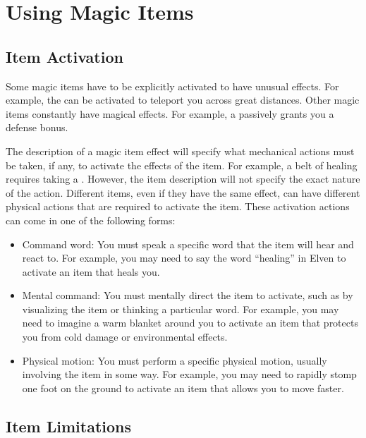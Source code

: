 \section{Using Magic Items}

    \subsection{Item Activation}

        Some magic items have to be explicitly activated to have unusual effects.
        For example, the  can be activated to teleport you across great distances.
        Other magic items constantly have magical effects.
        For example, a  passively grants you a defense bonus.

        The description of a magic item effect will specify what mechanical actions must be taken, if any, to activate the effects of the item.
        For example, a belt of healing requires taking a .
        However, the item description will not specify the exact nature of the action.
        Different items, even if they have the same effect, can have different physical actions that are required to activate the item.
        These activation actions can come in one of the following forms:
        \begin{itemize}
           \item Command word: You must speak a specific word that the item will hear and react to.
                For example, you may need to say the word ``healing'' in Elven to activate an item that heals you.
            \item Mental command: You must mentally direct the item to activate, such as by visualizing the item or thinking a particular word.
                For example, you may need to imagine a warm blanket around you to activate an item that protects you from cold damage or environmental effects.
            \item Physical motion: You must perform a specific physical motion, usually involving the item in some way.
                For example, you may need to rapidly stomp one foot on the ground to activate an item that allows you to move faster.
        \end{itemize}


    \subsection{Item Limitations}

